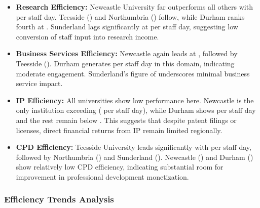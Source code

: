 \documentclass[journal,onecolumn, 10pt,draftclsnofoot]{IEEEtran}
\begin{document}
\begin{itemize}
    \item \textbf{Research Efficiency:} Newcastle University far outperforms all others with  per staff day. Teesside () and Northumbria () follow, while Durham ranks fourth at . Sunderland lags significantly at  per staff day, suggesting low conversion of staff input into research income.
    
    \item \textbf{Business Services Efficiency:} Newcastle again leads at , followed by Teesside (). Durham generates  per staff day in this domain, indicating moderate engagement. Sunderland's figure of  underscores minimal business service impact.
    
    \item \textbf{IP Efficiency:} All universities show low performance here. Newcastle is the only institution exceeding  ( per staff day), while Durham shows  per staff day and the rest remain below . This suggests that despite patent filings or licenses, direct financial returns from IP remain limited regionally.
    
    \item \textbf{CPD Efficiency:} Teesside University leads significantly with  per staff day, followed by Northumbria () and Sunderland (). Newcastle () and Durham () show relatively low CPD efficiency, indicating substantial room for improvement in professional development monetization.
\end{itemize}

\subsubsection{Efficiency Trends Analysis}
\end{document}
